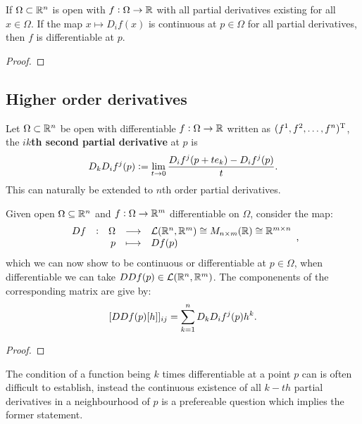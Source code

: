 \documentclass[../Year2.tex]{subfiles}
\begin{document}
\begin{theorem}
    If $\Omega\subset\mathbb{R}^n$ is open with $f:\Omega\rightarrow\mathbb{R}$ with all partial derivatives existing for all $x\in\Omega$. If the map $x\mapsto D_i f(x)$ is continuous at $p\in\Omega$ for all partial derivatives, then $f$ is differentiable at $p$.
    \begin{proof}
        
    \end{proof}
\end{theorem}

\subsection{Higher order derivatives}

\begin{definition}
    Let $\Omega\subset\mathbb{R}^n$ be open with differentiable $f:\Omega\rightarrow\mathbb{R}$ written as $(f^1,f^2,\ldots,f^n)^{\mathrm{T}}$, the \textbf{$ik$th second partial derivative} at $p$ is \[
        D_k D_i f^j(p) := \lim_{t\rightarrow 0}\frac{D_i f^j(p+te_k)-D_i f^j(p)}{t} \text{\textcolor{black}{.}}
    \] This can naturally be extended to $n$th order partial derivatives.
\end{definition}

\begin{theorem}
    Given open $\Omega\subseteq\mathbb{R}^n$ and $f:\Omega\rightarrow\mathbb{R}^m$ differentiable on $\Omega$, consider the map: \[
        \function[Df]{\Omega}{\LLL(\RR^n,\RR^m)\cong M_{n\times m}(\RR)\cong \RR^{m\times n}}{p}{Df(p)}\black{,}
    \] which we can now show to be continuous or differentiable at $p\in\Omega$, when differentiable we can take $DDf(p)\in\mathcal{L}(\mathbb{R}^n,\mathbb{R}^m)$. The componenents of the corresponding matrix are give by: \[
        [DDf(p)[h]]_{ij} = \sum_{k=1}^n D_k D_i f^j(p)h^k\text{\textcolor{black}{.}}
    \]
    \vspace{-10pt}
    \begin{proof}
        
    \end{proof}
\end{theorem}

\begin{remark}
    The condition of a function being $k$ times differentiable at a point $p$ can is often difficult to establish, instead the continuous existence of all $k-th$ partial derivatives in a neighbourhood of $p$ is a prefereable question which implies the former statement.
\end{remark}
\end{document}
